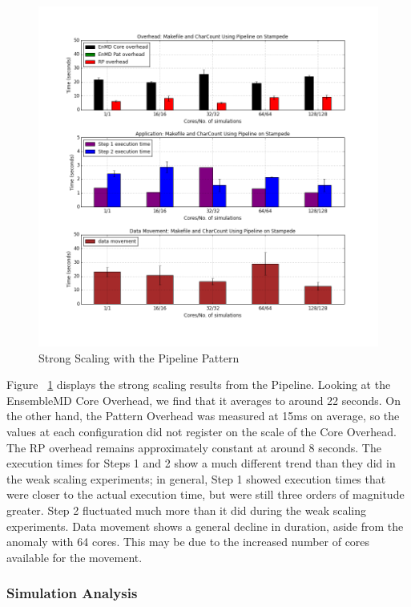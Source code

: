 \documentclass[]{article}
\begin{document}
			\begin{figure}[H]
				\centering
				\includegraphics[scale=.30]{img/pipeline_strong_scaling.png}
				\caption{Strong Scaling with the Pipeline Pattern}
				\label{fig:pipeline_strong_scaling}
			\end{figure}

			Figure ~\ref{fig:pipeline_strong_scaling} displays the strong scaling results from the Pipeline. Looking at the EnsembleMD Core Overhead, we find that it averages to around 22 seconds. On the other hand, the Pattern Overhead was measured at 15ms on average, so the values at each configuration did not register on the scale of the Core Overhead. The RP overhead remains approximately constant at around 8 seconds. The execution times for Steps 1 and 2 show a much different trend than they did in the weak scaling experiments; in general, Step 1 showed execution times that were closer to the actual execution time, but were still three orders of magnitude greater. Step 2 fluctuated much more than it did during the weak scaling experiments.
			Data movement shows a general decline in duration, aside from the anomaly with 64 cores. This may be due to the increased number of cores available for the movement.

		\subsubsection{Simulation Analysis}
\end{document}
